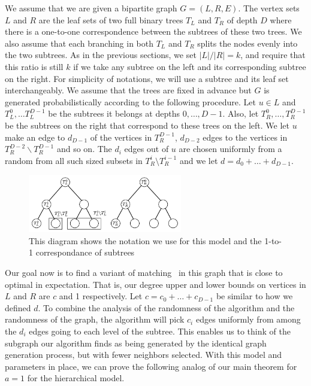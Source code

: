 We assume that we are given a bipartite graph $G=(L,R,E)$. The vertex sets $L$
and $R$ are the leaf sets of two full binary trees $T_L$ and $T_R$ of
depth $D$ where there is a one-to-one correspondence between the
subtrees of these two trees. We also assume that each branching in
both $T_L$ and $T_R$ splits the nodes evenly into the two
subtrees. As in the previous sections, we set $|L|/|R|=k$,
and require that this ratio is still $k$ if we take any subtree on the left
and its corresponding subtree on the right. For simplicity of notations, we
will use a subtree and its leaf set interchangeably. We assume that the trees are
fixed in advance but $G$ is generated probabilistically according to
the following procedure. Let $u\in L$ and $T_L^0, \ldots T^{D-1}_L$ be
the subtrees it belongs at depths $0,\ldots, D-1$. Also, let
$T_R^0,\ldots, T_R^{D-1}$ be the subtrees on the right that correspond
to these trees on the left. We let $u$ make an edge to $d_{D-1}$ of
the vertices in $T_{R}^{D-1}$, $d_{D-2}$ edges to the vertices in
$T_{R}^{D-2} \backslash T_{R}^{D-1}$ and so on. The $d_i$ edges out of $u$ are chosen uniformly from a random from all such sized subsets in $T_R^i \setminus T_R^{i-1}$ %
and we let $d = d_{0} + \ldots + d_{D-1}$.\vs

\begin{figure}[h]
\centering
\includegraphics[width=0.6\textwidth]{images/hierarchy_tree.png}
\begin{minipage}[h]{0.7\textwidth}
\caption{This diagram shows the notation we use for this model and the 1-to-1 correspondance of subtrees}
\end{minipage}
\end{figure}

Our goal now is to find a variant of matching~\cite{Gabow1983} in this graph that is close to optimal in expectation. That is, our degree upper and lower bounds on vertices in $L$ and $R$ are $c$ and 1 respectively. Let $c
= c_0 + \ldots + c_{D-1}$ be similar to how we defined $d$.
To combine the analysis of the randomness of the algorithm
and the randomness of the graph, the algorithm will pick $c_{i}$ edges
uniformly from among the $d_{i}$ edges going to each level of the
subtree. This enables us to think of the subgraph our algorithm
finds as being generated by the identical graph generation process, but with
fewer neighbors selected. With this model and parameters in place, we can prove the following analog of our main theorem for $a=1$ for the hierarchical model.\

